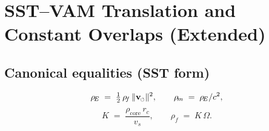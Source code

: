 \documentclass[11pt]{article}
\newcommand{\swirlarrow}{%
	\mathchoice{\mkern-2mu\scriptstyle\boldsymbol{\circlearrowleft}}%
	{\mkern-2mu\scriptstyle\boldsymbol{\circlearrowleft}}%
	{\mkern-2mu\scriptscriptstyle\boldsymbol{\circlearrowleft}}%
	{\mkern-2mu\scriptscriptstyle\boldsymbol{\circlearrowleft}}%
}
\newcommand{\vswirl}{\mathbf{v}_{\swirlarrow}}
\newcommand{\vscore}{v_s}                                %
\newcommand{\vnorm}{\lVert \vswirl \rVert}               %
\newcommand{\rhoF}{\rho_{\!f}}                           %
\newcommand{\rhoE}{\rho_{\!E}}                           %
\newcommand{\rhoM}{\rho_{\!m}}                           %
\newcommand{\rhoC}{\rho_{\mathrm{core}}} %
\begin{document}
	\titlepageOpen

	\begin{abstract}
		\noindent
		This note provides a rigorous nomenclature concordance between the legacy VAM presentation and the Swirl--String Theory (SST) house style. It establishes a one-to-one mapping of symbols and terminology while preserving the underlying kinematics, operators, and calibrated constants. In particular, it fixes the canonical SST equalities
        \[
          \rhoE=\tfrac12\,\rhoF\,\vnorm^{2},\qquad
          \rhoM=\rhoE/c^{2},\qquad
          K=\frac{\rhoC\, r_c}{\vscore},\quad
          \rhoF=K\,\Omega,
        \]
		and records that all published numerical values for $\vscore$, $r_c$, $\rhoC$, the background density, and the sectoral force bounds carry over unchanged. The document includes compact translation tables (fields/kinematics/operators; densities/velocities/coarse--graining; global scales) and a minimal macro layer (\verb|\rhoF|, \verb|\rhoE|, \verb|\rhoM|, \verb|\rhoC|, \verb|\vswirl|, \verb|\vnorm|) to prevent notation drift in large projects. Legacy wording is restricted to historical citations; narrative prose adopts the neutral SST vocabulary (e.g., \emph{foliation}, \emph{swirl string}) without altering the mathematics. Compatibility is ensured both for standalone use (title page + metadata) and for modular inclusion (\verb|\providecommand| guards and no additional package requirements). The result is a drop-in “translation guide’’ that guarantees dimensional consistency, unambiguous symbol usage, and reproducible cross-referencing across manuscripts that span the VAM$\to$SST transition.


	\end{abstract}

	\titlepageClose
	\fi

	\ifdefined\standalonechapter
	\section{\papertitle}
	\else
	\fi



\section{SST--VAM Translation and Constant Overlaps (Extended)}

	\subsection*{Canonical equalities (SST form)}
	\[
		\rhoE \;=\; \tfrac12\,\rhoF\,\vnorm^{2},\qquad
		\rhoM \;=\; \rhoE/c^{2},
	\]
	\[
		K \;=\; \frac{\rhoC\, r_c}{\vscore},\qquad
		\rhoF \;=\; K\,\Omega .
	\]
\end{document}
